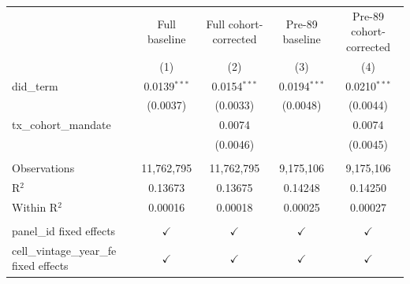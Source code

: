 
\begingroup
\centering
\begin{tabular}{lcccc}
   \toprule
                                            & Full baseline  & Full cohort-corrected & Pre-89 baseline & Pre-89 cohort-corrected \\   
                                            & (1)            & (2)                   & (3)             & (4)\\  
   \midrule 
   did\_term                                & 0.0139$^{***}$ & 0.0154$^{***}$        & 0.0194$^{***}$  & 0.0210$^{***}$\\   
                                            & (0.0037)       & (0.0033)              & (0.0048)        & (0.0044)\\   
   tx\_cohort\_mandate                      &                & 0.0074                &                 & 0.0074\\   
                                            &                & (0.0046)              &                 & (0.0045)\\   
    \\
   Observations                             & 11,762,795     & 11,762,795            & 9,175,106       & 9,175,106\\  
   R$^2$                                    & 0.13673        & 0.13675               & 0.14248         & 0.14250\\  
   Within R$^2$                             & 0.00016        & 0.00018               & 0.00025         & 0.00027\\  
    \\
   panel\_id fixed effects                  & $\checkmark$   & $\checkmark$          & $\checkmark$    & $\checkmark$\\   
   cell\_vintage\_year\_fe fixed effects    & $\checkmark$   & $\checkmark$          & $\checkmark$    & $\checkmark$\\   
   \bottomrule
\end{tabular}
\par\endgroup


